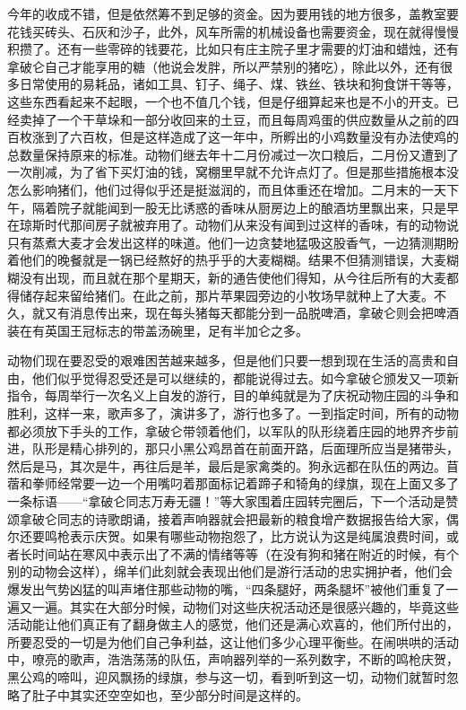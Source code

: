 今年的收成不错，但是依然筹不到足够的资金。因为要用钱的地方很多，盖教室要花钱买砖头、石灰和沙子，此外，风车所需的机械设备也需要资金，现在就得慢慢积攒了。还有一些零碎的钱要花，比如只有庄主院子里才需要的灯油和蜡烛，还有拿破仑自己才能享用的糖（他说会发胖，所以严禁别的猪吃），除此以外，还有很多日常使用的易耗品，诸如工具、钉子、绳子、煤、铁丝、铁块和狗食饼干等等，这些东西看起来不起眼，一个也不值几个钱，但是仔细算起来也是不小的开支。已经卖掉了一个干草垛和一部分收回来的土豆，而且每周鸡蛋的供应数量从之前的四百枚涨到了六百枚，但是这样造成了这一年中，所孵出的小鸡数量没有办法使鸡的总数量保持原来的标准。动物们继去年十二月份减过一次口粮后，二月份又遭到了一次削减，为了省下买灯油的钱，窝棚里早就不允许点灯了。但是那些措施根本没怎么影响猪们，他们过得似乎还是挺滋润的，而且体重还在增加。二月末的一天下午，隔着院子就能闻到一股无比诱惑的香味从厨房边上的酿酒坊里飘出来，只是早在琼斯时代那间房子就被弃用了。动物们从来没有闻到过这样的香味，有的动物说只有蒸煮大麦才会发出这样的味道。他们一边贪婪地猛吸这股香气，一边猜测期盼着他们的晚餐就是一锅已经熬好的热乎乎的大麦糊糊。结果不但猜测错误，大麦糊糊没有出现，而且就在那个星期天，新的通告使他们得知，从今往后所有的大麦都得储存起来留给猪们。在此之前，那片苹果园旁边的小牧场早就种上了大麦。不久，就又有消息传出来，现在每头猪每天都能分到一品脱啤酒，拿破仑则会把啤酒装在有英国王冠标志的带盖汤碗里，足有半加仑之多。

动物们现在要忍受的艰难困苦越来越多，但是他们只要一想到现在生活的高贵和自由，他们似乎觉得忍受还是可以继续的，都能说得过去。如今拿破仑颁发又一项新指令，每周举行一次名义上自发的游行，目的单纯就是为了庆祝动物庄园的斗争和胜利，这样一来，歌声多了，演讲多了，游行也多了。一到指定时间，所有的动物都必须放下手头的工作，拿破仑带领着他们，以军队的队形绕着庄园的地界齐步前进，队形是精心排列的，那只小黑公鸡昂首在前面开路，后面理所应当是猪带头，然后是马，其次是牛，再往后是羊，最后是家禽类的。狗永远都在队伍的两边。苜蓿和拳师经常要一边一个用嘴叼着那面标记着蹄子和犄角的绿旗，现在上面又多了一条标语——“拿破仑同志万寿无疆！”等大家围着庄园转完圈后，下一个活动是赞颂拿破仑同志的诗歌朗诵，接着声响器就会把最新的粮食增产数据报告给大家，偶尔还要鸣枪表示庆贺。如果有哪些动物抱怨了，比方说认为这是纯属浪费时间，或者长时间站在寒风中表示出了不满的情绪等等（在没有狗和猪在附近的时候，有个别的动物会这样），绵羊们此刻就会表现出他们是游行活动的忠实拥护者，他们会爆发出气势凶猛的叫声堵住那些动物的嘴，“四条腿好，两条腿坏”被他们重复了一遍又一遍。其实在大部分时候，动物们对这些庆祝活动还是很感兴趣的，毕竟这些活动能让他们真正有了翻身做主人的感觉，他们还是满心欢喜的，他们所付出的，所要忍受的一切是为他们自己争利益，这让他们多少心理平衡些。在闹哄哄的活动中，嘹亮的歌声，浩浩荡荡的队伍，声响器列举的一系列数字，不断的鸣枪庆贺，黑公鸡的啼叫，迎风飘扬的绿旗，参与这一切，看到听到这一切，动物们就暂时忽略了肚子中其实还空空如也，至少部分时间是这样的。

